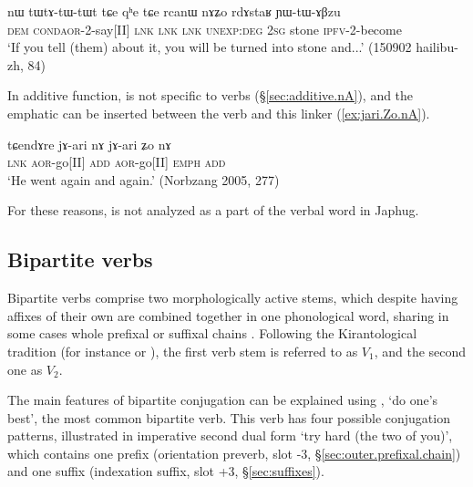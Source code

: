 \begin{exe}
\ex \label{ex:tWtAtWtWt.tCe}
\gll nɯ tɯ\redp{}tɤ-tɯ-tɯt tɕe qʰe tɕe rcanɯ nɤʑo rdɤstaʁ ɲɯ-tɯ-ɤβzu \\
\textsc{dem} \textsc{cond}\redp{}\textsc{aor}-2-say[II] \textsc{lnk} \textsc{lnk} \textsc{lnk} \textsc{unexp}:\textsc{deg} \textsc{2sg} stone \textsc{ipfv}-2-become \\
\glt `If you tell (them) about it, you will be turned into stone and...' (150902 hailibu-zh, 84)
\end{exe}

In additive function,  is not specific to verbs (§\ref{sec:additive.nA}), and the emphatic  can be inserted between the verb and this linker (\ref{ex:jari.Zo.nA}).

\begin{exe}
\ex \label{ex:jari.Zo.nA}
\gll tɕendɤre jɤ-ari nɤ jɤ-ari ʑo nɤ \\
\textsc{lnk} \textsc{aor}-go[II] \textsc{add} \textsc{aor}-go[II] \textsc{emph} \textsc{add} \\
\glt `He went again and again.' (Norbzang 2005, 277)
\end{exe}

For these reasons,  is not analyzed as a part of the verbal word in Japhug.

\subsection{Bipartite verbs} \label{sec:bipartite}
Bipartite verbs comprise two morphologically active stems, which despite having affixes of their own are combined together in one phonological word, sharing in some cases whole prefixal or suffixal chains \citep{jacques18bipartite}. Following the Kirantological tradition (for instance \citealt{doornenbal09} or \citealt{schackow15yakkha}), the first verb stem is referred to as $V_1$, and the second one as $V_2$.

The main features of bipartite conjugation can be explained using  , `do one's best', the most common bipartite verb. This verb has four possible conjugation patterns, illustrated in  imperative second dual form `try hard (the two of you)', which contains one prefix (orientation preverb, slot -3, §\ref{sec:outer.prefixal.chain}) and one suffix (indexation suffix, slot +3, §\ref{sec:suffixes}).
 
